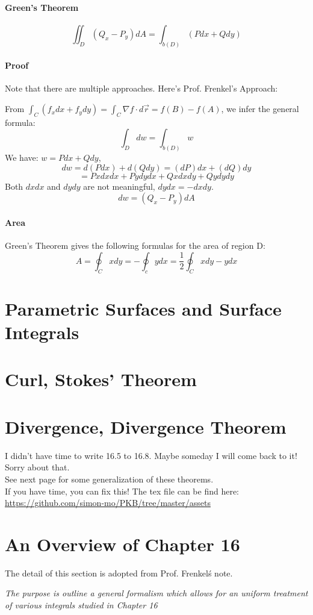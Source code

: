 \documentclass[11pt, oneside]{article}   	%
\begin{document}
\paragraph{Green's Theorem}
$$\iint_D (Q_x - P_y)dA = \int_{b(D)} (Pdx + Qdy)$$
\paragraph{Proof}
Note that there are multiple approaches. Here's Prof. Frenkel's Approach: 
\par
From $\int_C (f_x dx + f_y dy) = \int_C \nabla f \cdot d\vec{r} = f(B) - f(A)$, we infer the general formula: 
$$\int_D dw = \int_{b(D)} w$$
We have: $w = Pdx + Qdy$,
$$dw = d(Pdx) + d(Qdy) = (dP)dx + (dQ)dy$$
$$= Pxdxdx + Pydydx + Qxdxdy + Qydydy$$
Both $dxdx$ and $dydy$ are not meaningful, $dydx = -dxdy$.
$$dw = (Q_x - P_y)dA$$
\paragraph{Area}
Green's Theorem gives the following formulas for the area of region D: $$A = \oint_C xdy = -\oint_c ydx = \frac{1}{2} \oint_C xdy-ydx$$

\pagebreak
\section{Parametric Surfaces and Surface Integrals}


\section{Curl, Stokes' Theorem}

\section{Divergence, Divergence Theorem}
I didn't have time to write 16.5 to 16.8. Maybe someday I will come back to it!
Sorry about that. \\
See next page for some generalization of these theorems. \\
If you have time, you can fix this! The tex file can be find here:\\
\url{https://github.com/simon-mo/PKB/tree/master/assets}

\pagebreak
\section{An Overview of Chapter 16}
The detail of this section is adopted from Prof. Frenkel\'s note. 
\par
\emph{The purpose is outline a general formalism which allows for an uniform treatment of various integrals studied in Chapter 16}
\par
\end{document}

